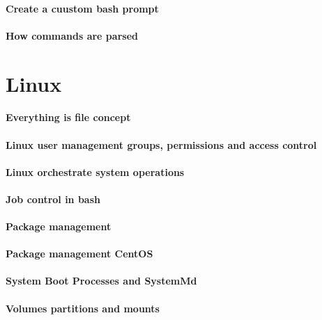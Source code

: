 \documentclass[a4paper, 11pt]{book}
\begin{document}
    \subsubsection{Create a cuustom bash prompt}

    \subsubsection{How commands are parsed}


    \chapter{Linux}

    \subsubsection{Everything is file concept}

    \subsubsection{Linux user management groups, permissions and access control}

    \subsubsection{Linux orchestrate system operations}

    \subsubsection{Job control in bash}

    \subsubsection{Package management}

    \subsubsection{Package management CentOS}

    \subsubsection{System Boot Processes and SystemMd}

    \subsubsection{Volumes partitions and mounts}
\end{document}
